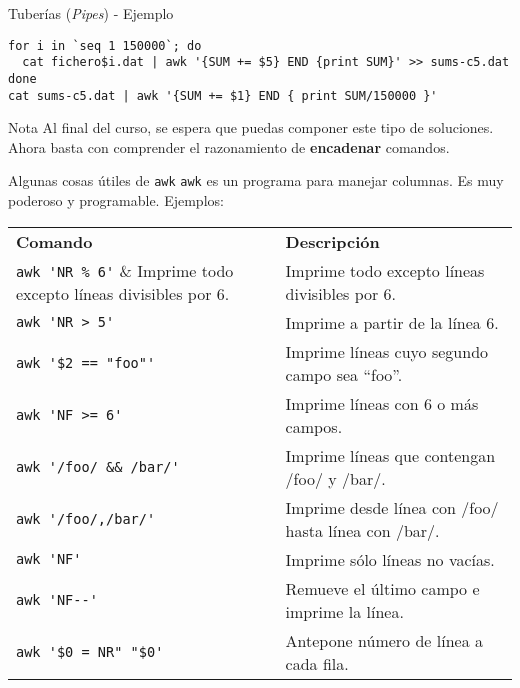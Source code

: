 \documentclass[10pt]{beamer}
\begin{document}
\begin{frame}[fragile]{Tuberías (\textit{Pipes}) - Ejemplo}
\begin{verbatim}
for i in `seq 1 150000`; do
  cat fichero$i.dat | awk '{SUM += $5} END {print SUM}' >> sums-c5.dat
done
cat sums-c5.dat | awk '{SUM += $1} END { print SUM/150000 }'
\end{verbatim}

\begin{block}{Nota}
Al final del curso, se espera que puedas componer este tipo de soluciones.  
Ahora basta con comprender el razonamiento de \textbf{encadenar} comandos.
\end{block}
\end{frame}

\begin{frame}[fragile]{Algunas cosas útiles de \texttt{awk}}
\texttt{awk} es un programa para manejar columnas. Es muy poderoso y programable.  
Ejemplos:
\begin{table}\footnotesize
\begin{tabular}{ll}
\textbf{Comando} & \textbf{Descripción} \\
\verb|awk 'NR % 6'| & Imprime todo excepto líneas divisibles por 6. \\
\verb|awk 'NR > 5'| & Imprime a partir de la línea 6. \\
\verb|awk '$2 == "foo"'| & Imprime líneas cuyo segundo campo sea “foo”. \\
\verb|awk 'NF >= 6'| & Imprime líneas con 6 o más campos. \\
\verb|awk '/foo/ && /bar/'| & Imprime líneas que contengan /foo/ y /bar/. \\
\verb|awk '/foo/,/bar/'| & Imprime desde línea con /foo/ hasta línea con /bar/. \\
\verb|awk 'NF'| & Imprime sólo líneas no vacías. \\
\verb|awk 'NF--'| & Remueve el último campo e imprime la línea. \\
\verb|awk '$0 = NR" "$0'| & Antepone número de línea a cada fila.
\end{tabular}
\end{table}
\end{frame}
\end{document}
